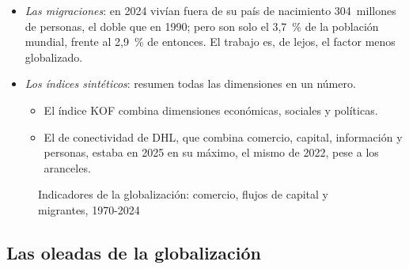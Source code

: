 \documentclass[11pt]{article}
\begin{document}
\begin{itemize}
\begin{itemize}
  \item y los \emph{stocks}, los activos y pasivos exteriores acumulados (la posición de inversión internacional): crecieron muy deprisa entre 2000 y 2007 y, en porcentaje del PIB mundial, apenas han cambiado desde entonces\nocite{FMI2025ESR,LaneMilesiFerretti2018}.
  \item Dentro de los flujos, la inversión directa mundial llegó al 5~\% del PIB en 2007 y ronda hoy el 1~\%\nocite{BM2026WDIIED}.
  \end{itemize}
\item \emph{Las migraciones}: en 2024 vivían fuera de su país de nacimiento 304~millones de personas, el doble que en 1990; pero son solo el 3,7~\% de la población mundial, frente al 2,9~\% de entonces\nocite{ONU2025MigrantStock,OIM2026WMR}. El trabajo es, de lejos, el factor menos globalizado.
\item \emph{Los índices sintéticos}: resumen todas las dimensiones en un número.
  \begin{itemize}
  \item El índice KOF combina dimensiones económicas, sociales y políticas\nocite{Gygli2019KOF}.
  \item El de conectividad de DHL, que combina comercio, capital, información y personas, estaba en 2025 en su máximo, el mismo de 2022, pese a los aranceles\nocite{DHL2026GCR}.
  \end{itemize}
\end{itemize}

\begin{figure}[H]
\centering
\caption{Indicadores de la globalización: comercio, flujos de capital y migrantes, 1970-2024}\label{fig:indicadores-globalizacion}
\end{figure}

\subsection{Las oleadas de la globalización}\label{sec:oleadas}
\end{document}
